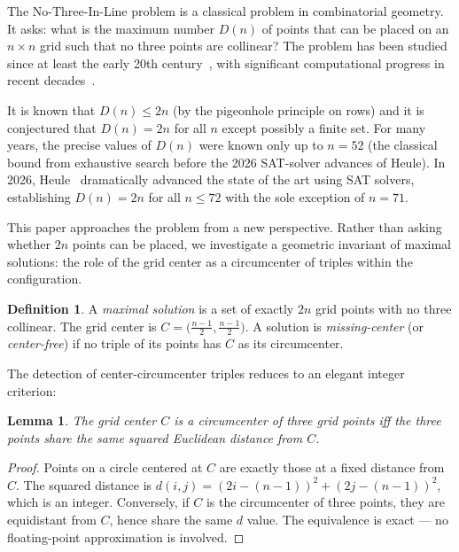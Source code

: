 \documentclass[11pt,a4paper]{article}
\theoremstyle{plain}
\newtheorem{lemma}[theorem]{Lemma}
\theoremstyle{definition}
\newtheorem{definition}[theorem]{Definition}
\begin{document}
The No-Three-In-Line problem is a classical problem in combinatorial geometry. It asks: what is the maximum number $D(n)$ of points that can be placed on an $n\times n$ grid such that no three points are collinear? The problem has been studied since at least the early 20th century~\cite{erdos1935}, with significant computational progress in recent decades~\cite{guy1994,flammenkamp}.

It is known that $D(n) \le 2n$ (by the pigeonhole principle on rows) and it is conjectured that $D(n) = 2n$ for all $n$ except possibly a finite set. For many years, the precise values of $D(n)$ were known only up to $n=52$ (the classical bound from exhaustive search before the 2026 SAT-solver advances of Heule). In 2026, Heule~\cite{heule2026} dramatically advanced the state of the art using SAT solvers, establishing $D(n)=2n$ for all $n\le 72$ with the sole exception of $n=71$.

This paper approaches the problem from a new perspective. Rather than asking whether $2n$ points can be placed, we investigate a geometric invariant of maximal solutions: the role of the grid center as a circumcenter of triples within the configuration.

\begin{definition}
A \emph{maximal solution} is a set of exactly $2n$ grid points with no three collinear. The grid center is $C = \bigl(\frac{n-1}{2},\frac{n-1}{2}\bigr)$. A solution is \emph{missing-center} (or \emph{center-free}) if no triple of its points has $C$ as its circumcenter.
\end{definition}

The detection of center-circumcenter triples reduces to an elegant integer criterion:

\begin{lemma}
\label{lem:distance}
The grid center $C$ is a circumcenter of three grid points iff the three points share the same squared Euclidean distance from $C$.
\end{lemma}

\begin{proof}
Points on a circle centered at $C$ are exactly those at a fixed distance from $C$. The squared distance is $d(i,j) = (2i-(n-1))^2 + (2j-(n-1))^2$, which is an integer. Conversely, if $C$ is the circumcenter of three points, they are equidistant from $C$, hence share the same $d$ value. The equivalence is exact --- no floating-point approximation is involved.
\end{proof}
\end{document}
